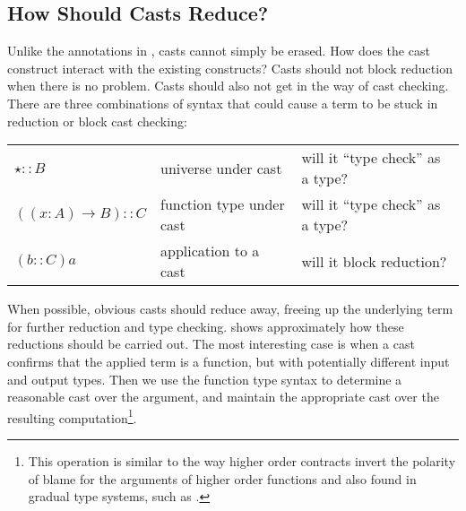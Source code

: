 \subsection{How Should Casts Reduce?}

Unlike the annotations in , casts cannot simply be erased. 
How does the cast construct interact with the existing constructs?
Casts should not block reduction when there is no problem.
Casts should also not get in the way of cast checking.
There are three combinations of syntax that could cause a term to be stuck in reduction or block cast checking:

\begin{tabular}{lll}
$\star::B$ & universe under cast & will it ``type check'' as a type?\tabularnewline
$\left(\left(x:A\right)\rightarrow B\right)::C$ & function type under cast & will it ``type check'' as a type?\tabularnewline
$\left(b::C\right)a$ & application to a cast & will it block reduction?\tabularnewline
\end{tabular}

When possible, obvious casts should reduce away, freeing up the underlying term for further reduction and type checking.
 shows approximately how these reductions should be carried out.
The most interesting case is when a cast confirms that the applied term is a function, but with potentially different input and output types.
Then we use the function type syntax to determine a reasonable cast over the argument, and maintain the appropriate cast over the resulting computation\footnote{
  This operation is similar to the way higher order contracts invert the polarity of blame for the arguments of higher order functions \cite{10.1145/581478.581484} and also found in gradual type systems, such as \cite{10.1007/978-3-642-00590-9_1}.
}.

